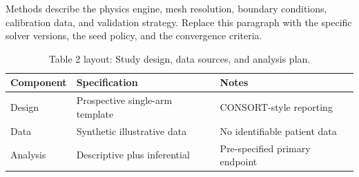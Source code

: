 
Methods describe the physics engine, mesh resolution, boundary conditions, calibration data, and validation strategy. Replace this paragraph with the specific solver versions, the seed policy, and the convergence criteria.

\begin{table}[H]
\caption{Table 2 layout: Study design, data sources, and analysis plan.}
\label{tab:methods_design}
\centering
\begin{tabular}{>{\raggedright\arraybackslash}p{3.4cm} >{\raggedright\arraybackslash}p{4.6cm} >{\raggedright\arraybackslash}p{5.4cm}}
\toprule
\textbf{Component} & \textbf{Specification} & \textbf{Notes} \\
\midrule
  Design & Prospective single-arm template & CONSORT-style reporting \\
  Data & Synthetic illustrative data & No identifiable patient data \\
  Analysis & Descriptive plus inferential & Pre-specified primary endpoint \\
\bottomrule
\end{tabular}
\end{table}
